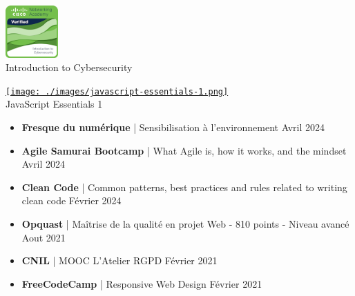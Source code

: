 \documentclass{article}
\begin{document}
\noindent
\begin{minipage}[t]{0.45\textwidth}
    \centering
    \href{https://www.credly.com/badges/6cc7444d-a897-46e0-880c-aae24bd23910}{\includegraphics[width=0.15\textwidth]{./images/introduction-to-cybersecurity.png}}
    \\
    Introduction to Cybersecurity
\end{minipage}
\hfill
\begin{minipage}[t]{0.45\textwidth}
    \centering
    \href{https://www.credly.com/badges/47bf9849-07c5-4995-a7fc-6826700dff6e/public_url}{\texttt{[image: ./images/javascript-essentials-1.png]}}
    \\
    JavaScript Essentials 1
\end{minipage}

\noindent
\vspace{1ex}
\begin{itemize}
    \item \textbf{Fresque du numérique} | Sensibilisation à l’environnement \hfill Avril 2024
    \item \textbf{Agile Samurai Bootcamp} | What Agile is, how it works, and the mindset \hfill Avril 2024
    \item \textbf{Clean Code} | Common patterns, best practices and rules related to writing clean code \hfill Février 2024
    \item \textbf{Opquast} | Maîtrise de la qualité en projet Web - 810 points - Niveau avancé \hfill Aout 2021
    \item \textbf{CNIL} | MOOC L'Atelier RGPD \hfill Février 2021
    \item \textbf{FreeCodeCamp} | Responsive Web Design \hfill Février 2021
\end{itemize}
\end{document}
